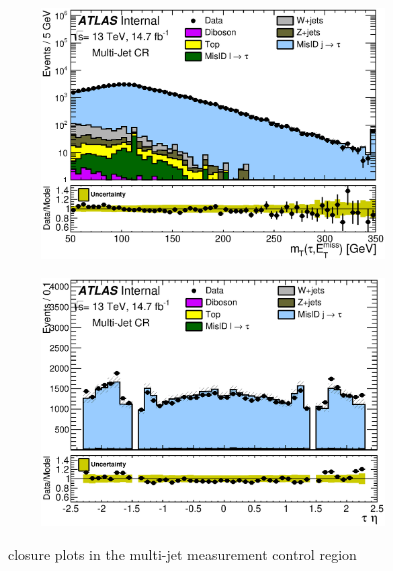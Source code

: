 \begin{figure}[h]
\begin{subfigure}{0.5\textwidth}
\caption{}
\end{subfigure}
\begin{subfigure}{0.5\textwidth}
   \includegraphics[width=\textwidth]{figures/DDQCD15_QCD_MT.eps}
\caption{}
\end{subfigure} %
\begin{subfigure}{0.5\textwidth}
   \includegraphics[width=\textwidth]{figures/DDQCD15_QCD_taueta.eps}
\caption{}
\end{subfigure}
\caption{\FF\ closure plots in the multi-jet measurement control region}
\label{fig:clMultiJ}
\end{figure}


